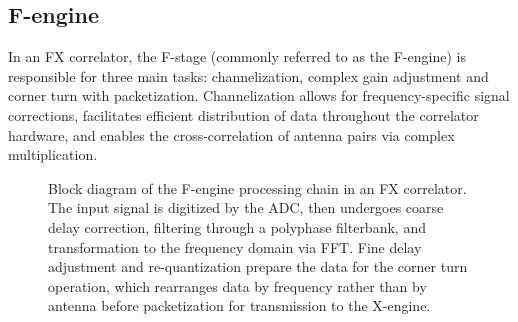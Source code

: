 \subsection{F-engine}
In an FX correlator, the F-stage (commonly referred to as the F-engine) is responsible for three main tasks: channelization, complex gain adjustment and corner turn with packetization. Channelization allows for frequency-specific signal corrections, facilitates efficient distribution of data throughout the correlator hardware, and enables the cross-correlation of antenna pairs via complex multiplication.
\begin{figure}[h]
	\centering
	\caption[Block diagram of the F-engine processing chain]{Block diagram of the F-engine processing chain in an FX correlator. The input signal is digitized by the ADC, then undergoes coarse delay correction, filtering through a polyphase filterbank, and transformation to the frequency domain via FFT. Fine delay adjustment and re-quantization prepare the data for the corner turn operation, which rearranges data by frequency rather than by antenna before packetization for transmission to the X-engine.}
	\label{fig:f-engine}
\end{figure}
